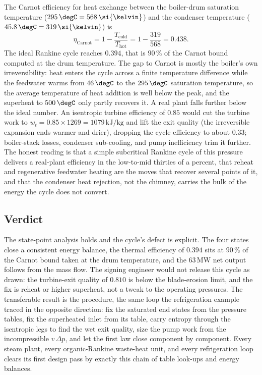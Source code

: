 The Carnot efficiency for heat exchange between the boiler-drum
saturation temperature ($295\,\degC = 568\,\si{\kelvin}$) and the
condenser temperature ($45.8\,\degC = 319\,\si{\kelvin}$) is
\[
\eta_{\text{Carnot}} = 1 - \frac{T_{\text{cold}}}{T_{\text{hot}}} = 1 -
\frac{319}{568} = 0.438.
\]
The ideal Rankine cycle reaches $0.394$, that is $90\,\%$ of the Carnot
bound computed at the drum temperature. The gap to Carnot is mostly the
boiler's own irreversibility: heat enters the cycle across a finite
temperature difference while the feedwater warms from $46\,\degC$ to the
$295\,\degC$ saturation temperature, so the average temperature of heat
addition is well below the peak, and the superheat to $500\,\degC$ only
partly recovers it. A real plant falls further below the ideal number. An
isentropic turbine efficiency of $0.85$ would cut the turbine work to
$w_t = 0.85\times 1269 = 1079\,\text{kJ}/\text{kg}$ and lift the exit
quality (the irreversible expansion ends warmer and drier), dropping the
cycle efficiency to about $0.33$; boiler-stack losses, condenser
sub-cooling, and pump inefficiency trim it further. The honest reading is
that a simple subcritical Rankine cycle of this pressure delivers a
real-plant efficiency in the low-to-mid thirties of a percent, that
reheat and regenerative feedwater heating are the moves that recover
several points of it, and that the condenser heat rejection, not the
chimney, carries the bulk of the energy the cycle does not convert.

\subsection{Verdict}

The state-point analysis holds and the cycle's defect is explicit. The
four states close a consistent energy balance, the thermal efficiency of
$0.394$ sits at $90\,\%$ of the Carnot bound taken at the drum
temperature, and the $63\,\text{MW}$ net output follows from the mass
flow. The signing engineer would not release this cycle as drawn: the
turbine-exit quality of $0.810$ is below the blade-erosion limit, and the
fix is reheat or higher superheat, not a tweak to the operating
pressures. The transferable result is the procedure, the same loop the
refrigeration example traced in the opposite direction: fix the saturated
end states from the pressure tables, fix the superheated inlet from its
table, carry entropy through the isentropic legs to find the wet exit
quality, size the pump work from the incompressible $v\,\Delta p$, and
let the first law close component by component. Every steam plant, every
organic-Rankine waste-heat unit, and every refrigeration loop clears its
first design pass by exactly this chain of table look-ups and energy
balances.

